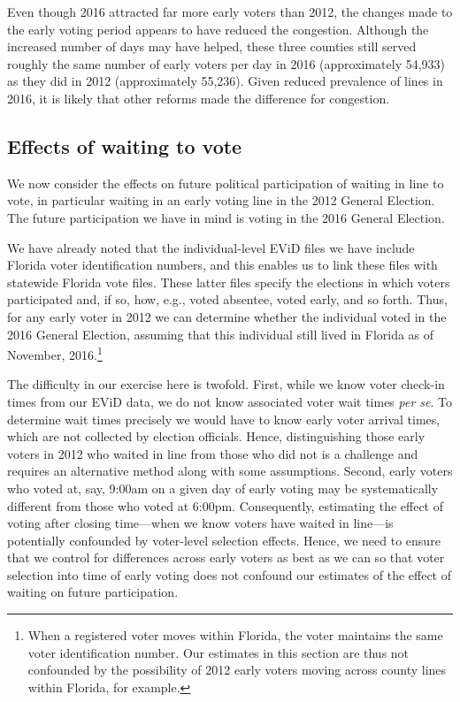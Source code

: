 \documentclass[12pt,titlepage]{article}
\begin{document}
Even though 2016 attracted far more early voters than 2012, the
changes made to the early voting period appears to have reduced the
congestion. Although the increased number of days may have helped,
these three counties still served roughly the same number of early
voters per day in 2016 (approximately 54,933) as they did in 2012
(approximately 55,236).  Given reduced prevalence of lines in 2016, it
is likely that other reforms made the difference for congestion.




\subsection*{Effects of waiting to vote}

We now consider the effects on future political participation of
waiting in line to vote, in particular waiting in an early voting line
in the 2012 General Election.  The future participation we have in
mind is voting in the 2016 General Election.

We have already noted that the individual-level EViD files we have
include Florida voter identification numbers, and this enables us to
link these files with statewide Florida vote files.  These latter
files specify the elections in which voters participated and, if so,
how, e.g., voted absentee, voted early, and so forth.  Thus, for any
early voter in 2012 we can determine whether the individual voted in
the 2016 General Election, assuming that this individual still lived
in Florida as of November, 2016.\footnote{When a registered voter
  moves within Florida, the voter maintains the same voter
  identification number.  Our estimates in this section are thus not
  confounded by the possibility of 2012 early voters moving across
  county lines within Florida, for example.}  

The difficulty in our exercise here is twofold.  First, while we know
voter check-in times from our EViD data, we do not know associated
voter wait times \emph{per se}.  To determine wait times precisely we
would have to know early voter arrival times, which are not collected
by election officials.  Hence, distinguishing those early voters in
2012 who waited in line from those who did not is a challenge and
requires an alternative method along with some assumptions.  Second,
early voters who voted at, say, 9:00am on a given day of early voting
may be systematically different from those who voted at
6:00pm. Consequently, estimating the effect of voting after closing
time---when we know voters have waited in line---is potentially
confounded by voter-level selection effects.  Hence, we need to ensure
that we control for differences across early voters as best as we can
so that voter selection into time of early voting does not confound
our estimates of the effect of waiting on future participation.
\end{document}
